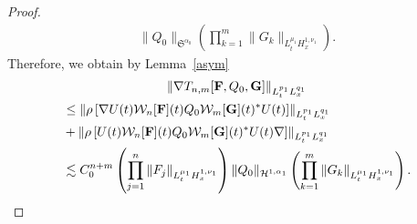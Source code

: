 \documentclass[10pt,a4paper]{amsart}
\providecommand{\No}[1]{\left\| #1 \right\|}
\newcommand{\vF}{{\mathbf{F}}}
\newcommand{\vG}{{\mathbf{G}}}
\newcommand{\CH}{\mathcal{H}}
\newcommand{\CW}{\mathcal{W}}
\newcommand{\FS}{\mathfrak{S}}
\newcommand{\al}{\alpha}
\newcommand{\rh}{\rho}
\newcommand{\Dk}[1]{\left[#1\right]}
\newcommand{\K}[1]{\left(#1\right)}
\renewcommand{\No}[1]{\left\| #1 \right\|}
\newcommand{\na}{\nabla}
\newcommand{\ls}{\lesssim}
\begin{document}
\begin{proof}
\begin{multline}
\|Q_0\|_{\FS^{\al_0}}
\K{\prod_{k=1}^m \|G_k\|_{L^{\mu_1}_t H^{1,\nu_1}_x}}. 
\end{multline}
Therefore, we obtain by Lemma~\ref{asym}
\begin{multline}
\left\|\na T_{n,m}[\vF,Q_0,\vG]\right\|_{L^{p_1}_t L^{q_1}_x} \\
\begin{aligned}
&\le \No{\rh \Dk{\na U(t) \CW_n[\vF](t) Q_0 \CW_m[\vG](t)^* U(t)}}_{L^{p_1}_t L^{q_1}_x} \\
&+ \No{\rh \Dk{U(t) \CW_n[\vF](t) Q_0 \CW_m[\vG](t)^* U(t) \na}}_{L^{p_1}_t L^{q_1}_x} \\
&\ls C_0^{n+m} \K{\prod_{j=1}^n \|F_j\|_{L^{\mu_1}_t H^{1,\nu_1}_x}} \|Q_0\|_{\CH^{1,\al_1}} \K{\prod_{k=1}^m \|G_k\|_{L^{\mu_1}_t H^{1,\nu_1}_x}}.\qedhere
\end{aligned}
\end{multline}
\end{proof}
\end{document}
